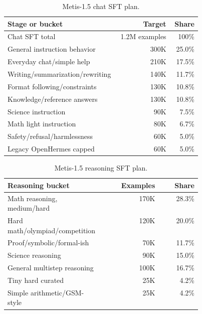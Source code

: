 \documentclass[11pt]{article}
\begin{document}
\begin{table}[h]
\centering
\begin{tabular}{p{0.45\linewidth}r r}
\toprule
Stage or bucket & Target & Share \\
\midrule
Chat SFT total & 1.2M examples & 100\% \\
General instruction behavior & 300K & 25.0\% \\
Everyday chat/simple help & 210K & 17.5\% \\
Writing/summarization/rewriting & 140K & 11.7\% \\
Format following/constraints & 130K & 10.8\% \\
Knowledge/reference answers & 130K & 10.8\% \\
Science instruction & 90K & 7.5\% \\
Math light instruction & 80K & 6.7\% \\
Safety/refusal/harmlessness & 60K & 5.0\% \\
Legacy OpenHermes capped & 60K & 5.0\% \\
\bottomrule
\end{tabular}
\caption{Metis-1.5 chat SFT plan.}
\label{tab:chat_sft}
\end{table}

\begin{table}[h]
\centering
\begin{tabular}{p{0.45\linewidth}r r}
\toprule
Reasoning bucket & Examples & Share \\
\midrule
Math reasoning, medium/hard & 170K & 28.3\% \\
Hard math/olympiad/competition & 120K & 20.0\% \\
Proof/symbolic/formal-ish & 70K & 11.7\% \\
Science reasoning & 90K & 15.0\% \\
General multistep reasoning & 100K & 16.7\% \\
Tiny hard curated & 25K & 4.2\% \\
Simple arithmetic/GSM-style & 25K & 4.2\% \\
\bottomrule
\end{tabular}
\caption{Metis-1.5 reasoning SFT plan.}
\label{tab:reason_sft}
\end{table}
\end{document}
